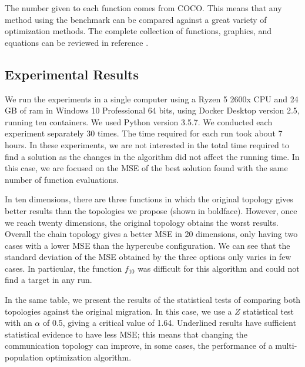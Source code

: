 \documentclass[runningheads]{llncs}
\begin{document}
The number given to each function comes from COCO. This means that any method
using the benchmark can be compared against a great variety of optimization
methods. The complete collection of functions, graphics, and equations can be
reviewed in reference \cite{bbob}.


\subsection{Experimental Results}

We run the experiments in a single computer using a Ryzen 5 2600x CPU and 24 GB
of ram in Windows 10 Professional 64 bits, using Docker Desktop version 2.5,
running ten containers. We used Python version 3.5.7. We conducted each
experiment separately 30 times. %
The time required for each run took about 7
hours. In these experiments, we are not interested in the total time required to
find a solution as the changes in the algorithm did not affect the running time.
In this case, we are focused on the MSE of the best solution found with the same
number of function evaluations.

In ten dimensions, there are three functions in which the original topology
gives better results than the topologies we propose (shown in boldface).
However, once we reach twenty dimensions, the original topology obtains the
worst results. Overall the chain topology gives a better MSE in 20 dimensions,
only having two cases with a lower MSE than the hypercube configuration. We can
see that the standard deviation of the MSE obtained by the three options only
varies in few cases. In particular, the function $f_{10}$ was difficult for this
algorithm and could not find a target in any run.

In the same table, we present the results of the statistical tests of comparing
both topologies against the original migration. In this case, we use a \(Z\)
statistical test with an $\alpha$ of 0.5, giving a critical value of 1.64.
Underlined results have sufficient statistical evidence to have less MSE; this
means that changing the communication topology can improve, in some cases, the
performance of a multi-population optimization algorithm.
\end{document}
